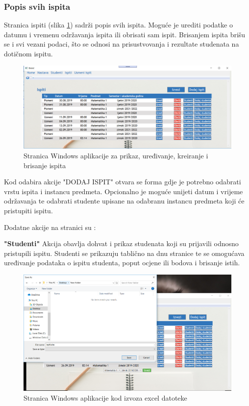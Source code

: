 \documentclass[times, utf8, diplomski]{fer}
\begin{document}
\subsubsection{Popis svih ispita}
Stranica ispiti (slika \ref{fig:examlist}) sadrži popis svih ispita. Moguće je urediti podatke o datumu i vremenu održavanja ispita ili obrisati sam ispit. Brisanjem ispita brišu se i svi vezani podaci, što se odnosi na prisustvovanja i rezultate studenata na dotičnom ispitu.

\begin{figure}[htb]
\centering
\includegraphics[width=12cm]{examlist2.PNG}
\caption{Stranica Windows aplikacije za prikaz, uređivanje, kreiranje i brisanje ispita}
\label{fig:examlist}
\end{figure}

Kod odabira akcije "DODAJ ISPIT" otvara se forma gdje je potrebno odabrati vrstu ispita i instancu predmeta. Opcionalno je moguće unijeti datum i vrijeme održavanja te odabrati studente upisane na odabranu instancu predmeta koji će pristupiti ispitu.

Dodatne akcije na stranici su :


\hfill\break
\textbf{"Studenti"} \hfill\break
Akcija obavlja dohvat i prikaz studenata koji su prijavili odnosno pristupili ispitu. Studenti se prikazuju tablično na dnu stranice te se omogućava uređivanje podataka o ispitu studenta, poput ocjene ili bodova i brisanje istih.

\begin{figure}[htb]
\centering
\includegraphics[width=12cm]{export.PNG}
\caption{Stranica Windows aplikacije kod izvoza excel datoteke}
\label{fig:exportDesktop}
\end{figure}
\end{document}
